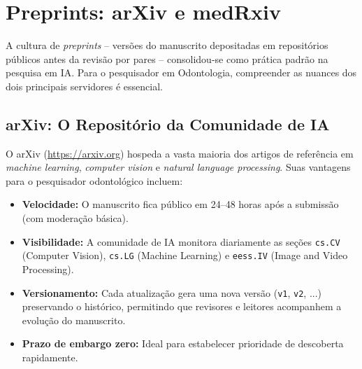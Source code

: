 
\section{Preprints: arXiv e medRxiv}
\label{sec:preprints}

\nivelquatro

A cultura de \textit{preprints} -- versões do manuscrito depositadas em
repositórios públicos antes da revisão por pares -- consolidou-se como prática
padrão na pesquisa em IA. Para o pesquisador em Odontologia, compreender as
nuances dos dois principais servidores é essencial.

  

\subsection{arXiv: O Repositório da Comunidade de IA}

O arXiv (\url{https://arxiv.org}) hospeda a vasta maioria dos artigos de
referência em \textit{machine learning}, \textit{computer vision} e
\textit{natural language processing}. Suas vantagens para o pesquisador
odontológico incluem:

\begin{itemize}
  \item \textbf{Velocidade:} O manuscrito fica público em 24--48 horas após a
    submissão (com moderação básica).
  \item \textbf{Visibilidade:} A comunidade de IA monitora diariamente as seções
    \texttt{cs.CV} (Computer Vision), \texttt{cs.LG} (Machine Learning) e
    \texttt{eess.IV} (Image and Video Processing).
  \item \textbf{Versionamento:} Cada atualização gera uma nova versão
    (\texttt{v1}, \texttt{v2}, ...) preservando o histórico, permitindo que
    revisores e leitores acompanhem a evolução do manuscrito.
  \item \textbf{Prazo de embargo zero:} Ideal para estabelecer prioridade de
    descoberta rapidamente.
\end{itemize}

